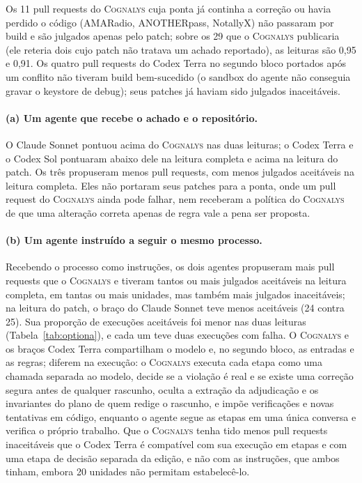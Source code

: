 \documentclass[conference]{IEEEtran}
\newcommand{\system}{\textsc{Cognalys}}
\begin{document}
Os 11 pull requests do \system{} cuja ponta já continha a correção ou havia perdido
o código (AMARadio, ANOTHERpass, NotallyX) não passaram por build e são julgados
apenas pelo patch; sobre os 29 que o \system{} publicaria (ele reteria dois cujo
patch não tratava um achado reportado), as leituras são 0,95 e 0,91. Os quatro
pull requests do Codex Terra no segundo bloco portados após um conflito não
tiveram build bem-sucedido (o sandbox do agente não conseguia gravar o keystore
de debug); seus patches já haviam sido julgados inaceitáveis.

\paragraph{(a) Um agente que recebe o achado e o repositório.} O Claude Sonnet
pontuou acima do \system{} nas duas leituras; o Codex Terra e o Codex Sol pontuaram
abaixo dele na leitura completa e acima na leitura do patch. Os
três propuseram menos pull requests, com menos julgados aceitáveis na
leitura completa. Eles não portaram
seus patches para a ponta, onde um pull request do \system{} ainda pode falhar, nem
receberam a política do \system{} de que uma alteração correta apenas de regra vale a pena ser proposta.

\paragraph{(b) Um agente instruído a seguir o mesmo processo.}
Recebendo o processo como instruções, os dois agentes propuseram mais pull requests
que o \system{} e tiveram tantos ou mais julgados aceitáveis na leitura completa,
em tantas ou mais unidades, mas também mais julgados inaceitáveis; na leitura do
patch, o braço do Claude Sonnet teve menos aceitáveis (24 contra 25). Sua proporção de
execuções aceitáveis foi menor nas duas leituras (Tabela~\ref{tab:optiona}), e
cada um teve duas execuções com falha. O \system{} e os braços Codex Terra
compartilham o modelo e, no segundo bloco, as entradas e as regras; diferem na
execução: o \system{} executa cada etapa como uma chamada separada ao modelo,
decide se a violação é real e se existe uma correção segura antes de qualquer
rascunho, oculta a extração da adjudicação e os invariantes do plano de quem
redige o rascunho, e impõe verificações e novas tentativas em código, enquanto o
agente segue as etapas em uma única conversa e verifica o próprio trabalho. Que o \system{} tenha tido menos
pull requests inaceitáveis que o Codex Terra é compatível com sua
execução em etapas e com uma etapa de decisão separada da edição, e não com as
instruções, que ambos tinham, embora 20 unidades não permitam estabelecê-lo.
\end{document}
